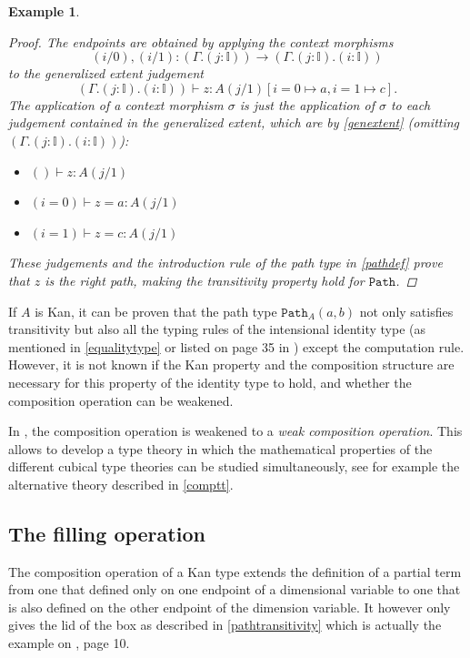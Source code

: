 \documentclass[12pt,a4paper,twoside,xetex]{book} %
\newcommand{\keyword}[1]{\emph{#1}\index{#1}}
\newtheorem{example}[theorem]{Example}
\newcommand{\op}[1]{\mathtt{#1}}
\begin{document}
\begin{example}
\begin{proof}
The endpoints are obtained by applying the context morphisms $$(i/0),(i/1): 
(\Gamma . ( j : \mathbb{I})) \rightarrow (\Gamma. ( j : \mathbb{I}) . ( i :  
\mathbb{I}))$$ to the generalized extent judgement $$(\Gamma. ( j : \mathbb{I}) 
. ( i :  \mathbb{I})) \vdash z : A(j/1) [i =0 \mapsto a, i=1 \mapsto c].$$ The 
application of a context morphism $\sigma$  is just the application of $\sigma$ 
to each judgement contained in the generalized extent, which are by \cref{genextent}
(omitting $(\Gamma. ( j : \mathbb{I}) . ( i :  \mathbb{I}))$):

\begin{itemize}
\item $ () \vdash z: A(j/1)$
\item $ (i = 0) \vdash z = a : A(j/1)$
\item $ (i = 1) \vdash z = c : A(j/1)$
\end{itemize}

These judgements and the introduction rule of the path type in \cref{pathdef} prove that $z$ is the right path, making the transitivity 
property hold for $\op{Path}$. 

\end{proof} 

\end{example}

If $A$ is Kan, it can be proven that the path type $\op{Path}_A(a,b)$ not only  
satisfies transitivity but also all the typing rules of  the intensional 
identity type (as mentioned in \cref{equalitytype} or listed on page 35 in 
\cite{Orton2019}) except the computation rule. However, it is not known if the Kan property and the composition structure are necessary for this property of the identity type to hold, and 
whether the composition operation can be weakened. 

In \cite{Cavallo2019}, the composition operation is weakened to a \keyword{weak composition operation}. This allows to develop a type theory 
in which the mathematical properties of the different cubical type theories can 
be studied simultaneously, see for example the alternative theory described in 
\cref{comptt}.


\subsection{The filling operation}\label{filling}

The composition operation of a Kan type extends the definition of a partial 
term from one that defined only on one  endpoint  of a dimensional variable to 
one that is also defined on the other endpoint of the dimension variable. It 
however only gives the lid of the box as described in 
\cref{pathtransitivity} which is actually the example  on \cite{Coquand2018}, 
page 10. 
\end{document}
